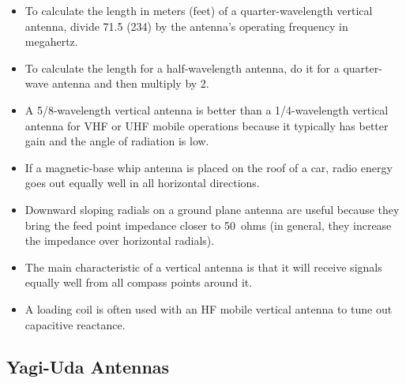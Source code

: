 \documentclass[letterpaper,12pt]{article}
\begin{document}
\begin{itemize}
\item To calculate the length in meters (feet) of a quarter-wavelength vertical antenna,
divide 71.5 (234) by the antenna's operating frequency in megahertz.
\item To calculate the length for a half-wavelength antenna, do it for a quarter-wave antenna and then multiply by 2.
\item A 5/8-wavelength vertical antenna is better than a 1/4-wavelength vertical antenna for VHF or UHF mobile operations
because it typically has better gain and the angle of radiation is low.
\item If a magnetic-base whip antenna is placed on the roof of a car, radio energy goes out equally well in all horizontal directions.
\item Downward sloping radials on a ground plane antenna are useful because they bring the feed point impedance closer to 50~ohms
(in general, they increase the impedance over horizontal radials).
\item The main characteristic of a vertical antenna is that it will receive signals equally well from all compass points around it.
\item A loading coil is often used with an HF mobile vertical antenna to tune out capacitive reactance.
\end{itemize}

\subsection{Yagi-Uda Antennas}
\end{document}
